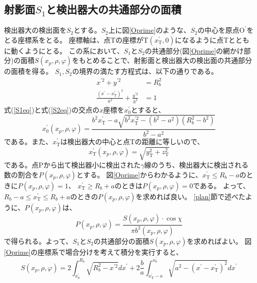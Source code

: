 \documentclass[11pt, titlepage, openany]{ltjsbook}
\begin{document}
\subsection{射影面$S_1$と検出器大の共通部分の面積}
検出器大の検出面を$S_2$とする。$S_2$上に図\ref{Oprime}のような、$S_2$の中心を原点$\mathrm{O}^{\prime}$をとる座標系をとる。
座標軸は、点Tの座標が$\mathrm{T}(x_\mathrm{T}^{\prime},0)$になるように点Tとともに動くようにとる。
この系において、$S_1$と$S_2$の共通部分(図\ref{Oprime}の網かけ部分)の面積$S(x_p, \rho, \varphi)$をもとめることで、射影面と検出器大の検出面の共通部分の面積を得る。
$S_1,S_2$の境界の満たす方程式は、以下の通りである。
\begin{align}
    x^{\prime 2} + y^{\prime 2} & = R_b^2 \label{S1eq} \\
    \frac{(x^{\prime} - x_{\mathrm{T}}^{\prime})^2}{a^2} + \frac{y^{\prime 2}}{b^2} & = 1 \label{S2eq}
\end{align}
式(\ref{S1eq})と式(\ref{S2eq})の交点の$x$座標を$x^{\prime}_0$とすると、
\begin{equation}
    x_0^{\prime}(x_p, \rho, \varphi) = \frac{b^2 x_{\mathrm{T}}^{\prime} - a \sqrt{ b^2 x_{\mathrm{T}}^{\prime2} - (b^2 - a^2)(R_b^2 - b^2) }}{b^2 - a^2}
\end{equation}
である。また、$x_{\mathrm{T}}^{\prime}$は検出器大の中心と点Tの距離に等しいので、
\begin{equation}
    x_{\mathrm{T}}^{\prime}(x_p, \rho, \varphi) = \sqrt{ y_{\mathrm{T}}^2 + z_{\mathrm{T}}^2 }
\end{equation}
である。点Pから出て検出器小に検出された$\gamma$線のうち、検出器大に検出される数の割合を$P(x_p, \rho, \varphi)$とする。
図\ref{Oprime}からわかるように、$x_{\mathrm{T}}^{\prime} \le R_b - a$のときに$P(x_p, \rho, \varphi) = 1$、
$x_{\mathrm{T}}^{\prime} \ge R_b + a$のときは$P(x_p, \rho, \varphi) = 0$である。
よって、$R_b - a \le x_{\mathrm{T}}^{\prime} \le R_b + a$のときの$P(x_p, \rho, \varphi)$を求めれば良い。
\ref{plan}節で述べたように、$P(x_p, \rho, \varphi)$は、
\begin{equation}
    P(x_p, \rho, \varphi) = \frac{S(x_p, \rho, \varphi) \cdot \cos\chi}{\pi b^2(x_p, \rho, \varphi)}
\end{equation}
で得られる。よって、$S_1$と$S_2$の共通部分の面積$S(x_p, \rho, \varphi)$を求めればよい。
図\ref{Oprime}の座標系で場合分けを考えて積分を実行すると、
\begin{equation}
    S(x_p, \rho, \varphi) = 2\int_{x_0^{\prime}}^{R_b} \sqrt{R_b^2 - x^{\prime2}}dx^{\prime}
    + 2\frac{b}{a} \int_{x_{\mathrm{T}}^{\prime}-a}^{x^{\prime}_0} \sqrt{a^2 - (x^{\prime} - x_{\mathrm{T}}^{\prime})^2}dx^{\prime}
\end{equation}
\end{document}
